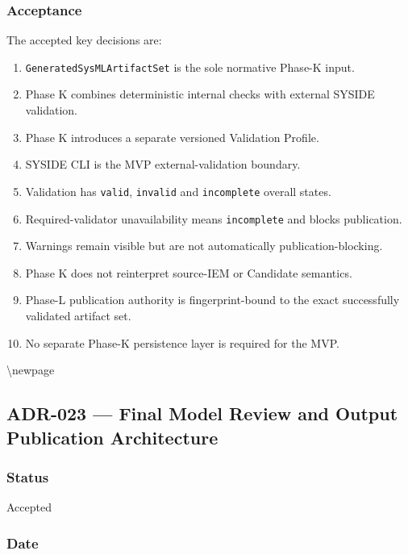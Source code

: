 \hypertarget{acceptance-2}{%
\subsubsection{Acceptance}\label{acceptance-2}}

The accepted key decisions are:

\begin{enumerate}
\def\labelenumi{\arabic{enumi}.}
\tightlist
\item
  \texttt{GeneratedSysMLArtifactSet} is the sole normative Phase-K input.
\item
  Phase K combines deterministic internal checks with external SYSIDE validation.
\item
  Phase K introduces a separate versioned Validation Profile.
\item
  SYSIDE CLI is the MVP external-validation boundary.
\item
  Validation has \texttt{valid}, \texttt{invalid} and \texttt{incomplete} overall states.
\item
  Required-validator unavailability means \texttt{incomplete} and blocks publication.
\item
  Warnings remain visible but are not automatically publication-blocking.
\item
  Phase K does not reinterpret source-IEM or Candidate semantics.
\item
  Phase-L publication authority is fingerprint-bound to the exact successfully validated artifact set.
\item
  No separate Phase-K persistence layer is required for the MVP.
\end{enumerate}

\textbackslash newpage

\hypertarget{adr-023--final-model-review-and-output-publication-architecture}{%
\subsection{ADR-023 --- Final Model Review and Output Publication Architecture}\label{adr-023--final-model-review-and-output-publication-architecture}}

\hypertarget{status-5}{%
\subsubsection{Status}\label{status-5}}

Accepted

\hypertarget{date-5}{%
\subsubsection{Date}\label{date-5}}

